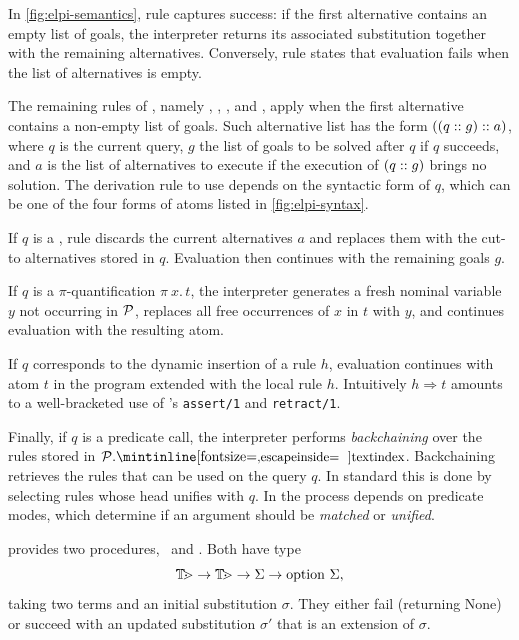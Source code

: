 In \cref{fig:elpi-semantics}, rule \runE[\top] captures success: if the first
alternative contains an empty list of goals, the interpreter returns its
associated substitution together with the remaining alternatives. Conversely,
rule \runE[\bot] states that evaluation fails when the list of alternatives is
empty.

The remaining rules of \runE, namely \runE[!], \runE[\backchain],
\runE[\forall], and \runE[\Rightarrow], apply when the first alternative
contains a non-empty list of goals. Such alternative list has the form
$((q::g)::{a)}$, where $q$ is the current query, $g$
the list of goals to be solved after $q$ if $q$ succeeds, and
$a$ is the list of alternatives to execute if the execution of
$(q::g)$ brings no solution. The derivation rule to use depends on
the syntactic form of $q$, which can be one of the four forms of atoms listed
in \cref{fig:elpi-syntax}.

If $q$ is a \cut, rule \runE[!] discards the current alternatives $a$ and
replaces them with the cut-to alternatives stored in $q$. Evaluation then
continues with the remaining goals $g$.

If $q$ is a $\pi$-quantification $\pi\ x.\,t$, the interpreter generates a fresh
nominal variable $y$ not occurring in $\mathcal{P}$, replaces all free occurrences of
$x$ in $t$ with $y$, and continues evaluation with the resulting atom.

If $q$ corresponds to the dynamic insertion of a rule $h$, evaluation continues
with atom $t$ in the program extended with the local rule $h$. Intuitively $h
\Rightarrow t$ amounts to a well-bracketed use of \prolog's \texttt{assert/1} and
\texttt{retract/1}.

Finally, if $q$ is a predicate call, the interpreter performs \emph{backchaining} over
the rules stored in $\prog.\txtI{index}$. Backchaining retrieves the rules that
can be used on the query $q$. In standard \prolog this is done by selecting
rules whose head unifies with $q$. In \elpi the process depends on predicate
modes, which determine if an argument should be \emph{matched} or \emph{unified}.

\elpi provides two procedures, \unify\ and \matching. Both have type
\[
\TERM \to \TERM \to \Sigma \to \mathrm{option}\ \Sigma,
\]
taking two terms and an initial substitution $\sigma$. They either fail
(returning None) or succeed with an updated substitution $\sigma'$ that is
an extension of $\sigma$.

